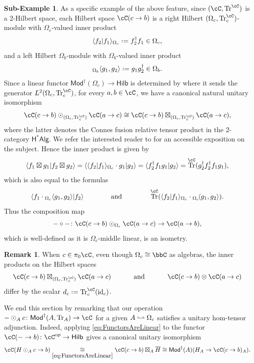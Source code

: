 \documentclass[12pt, reqno]{amsart}
\DeclareMathOperator{\id}{id}
\newcommand{\op}{\mathrm{op}}
\DeclareMathOperator{\Tr}{Tr}
\newcommand{\isometry}{\mathrel{\,\joinrel\lhook\joinrel\rightharpoonup}}
\newcommand{\Mod}{\mathsf{Mod}}
\newcommand{\Hilb}{\mathsf{Hilb}}
\newcommand{\HstarAlg}{\mathsf{H^*Alg}}
\theoremstyle{plain}
\theoremstyle{definition}
\newtheorem{sub-ex}[thm]{Sub-Example}
\newtheorem{rem}[thm]{Remark}
\newcommand{\coloneq}{:=}
\def\coloneq{\mathrel{\vcenter{\baselineskip0.55ex\lineskiplimit0pt\hbox{\upshape.}\hbox{\upshape.}}}=}
\begin{document}
\begin{sub-ex}
\label{sub-ex:ConnesFusion1}
As a specific example of the above feature, 
since $(\cC,\Tr^\cC)$ is a 2-Hilbert space, each Hilbert space $\cC(c\to b)$ is a right Hilbert $(\Omega_c,\Tr^\cC_c)$-module with $\Omega_c$-valued inner product
$$
\langle f_2|f_1\rangle_{\Omega_c}\coloneq f_2^\dag f_1 \in \Omega_c,
$$
and a left Hilbert $\Omega_b$-module with $\Omega_b$-valued inner product 
$$
{}_{\Omega_b}\langle g_1,g_2\rangle\coloneq g_1g_2^\dag\in \Omega_b.
$$
Since a linear functor
$\Mod^\dag(\Omega_c)\to \Hilb$ is determined by where it sends the generator $L^2(\Omega_c,\Tr^\cC_c)$,
for every $a,b\in \cC$,
we have a canonical natural unitary isomorphism
$$
\cC(c\to b)\odot_{(\Omega_c,\Tr^\cC_c)} \cC(a\to c)
\cong
\cC(c\to b)\boxtimes_{(\Omega_c,\Tr^\cC_c)} \cC(a\to c),
$$
where the latter denotes the Connes fusion relative tensor product in the 2-category $\HstarAlg$. 
We refer the interested reader to \cite[Part I, \S 3]{UQSLbook} for an accessible exposition on the subject.
Hence the inner product is given by
$$
\langle
f_1\boxtimes g_1
|
f_2\boxtimes g_2
\rangle
=
\langle
\langle f_2|f_1\rangle_{\Omega_c}\cdot g_1
|
g_2
\rangle
=
\langle f_2^\dag f_1 g_1|g_2\rangle
=
\Tr^\cC(g_2^\dag f_2^\dag f_1g_1),
$$
which is also equal to the formulas
$$
\langle
f_1\cdot {}_{\Omega_c}\langle g_1,g_2\rangle|
f_2
\rangle
\qquad\qquad\text{and}\qquad\qquad
\Tr^\cC(\langle f_2|f_1\rangle_{\Omega_c}\cdot{}_{\Omega_c}\!\langle g_1,g_2\rangle).
$$
Thus the composition map
$$
-\circ-\colon \cC(c\to b)\odot_{\Omega_c}\cC(a\to c)\to \cC(a\to b),
$$
which is well-defined as it is $\Omega_c$-middle linear, is an isometry.
\end{sub-ex}

\begin{rem}
When $c\in\pi_0\cC$,
even though $\Omega_c\cong \bbC$ as algebras, the inner products on the Hilbert spaces
$$
\cC(c\to b) \boxtimes_{(\Omega_c,\Tr^\cC_c)} \cC(a\to c)
\qquad\quad\text{ and }\qquad\quad
\cC(c\to b) \otimes \cC(a\to c)
$$
differ by the scalar $d_c \coloneq \Tr^\cC_c(\id_c)$.
\end{rem}

We end this section by remarking that our operation $-\odot_A c\colon  \Mod^\dag(A,\Tr_A)\to \cC$ for a given $A\isometry \Omega_c$ satisfies a unitary hom-tensor adjunction.
Indeed, applying \eqref{eq:FunctorsAreLinear} to the functor
$\cC(-\to b)\colon  \cC^{\op}\to \Hilb$ 
gives a canonical unitary isomorphism
\[
\cC(H \odot_A c \to b) \underset{\eqref{eq:FunctorsAreLinear}}{\cong} 
\cC(c \to b) 
\boxtimes_A 
\overline{H} 
\cong 
\Mod^\dag(A)(H_A \to \cC(c \to b)_A).
\]
\end{document}
